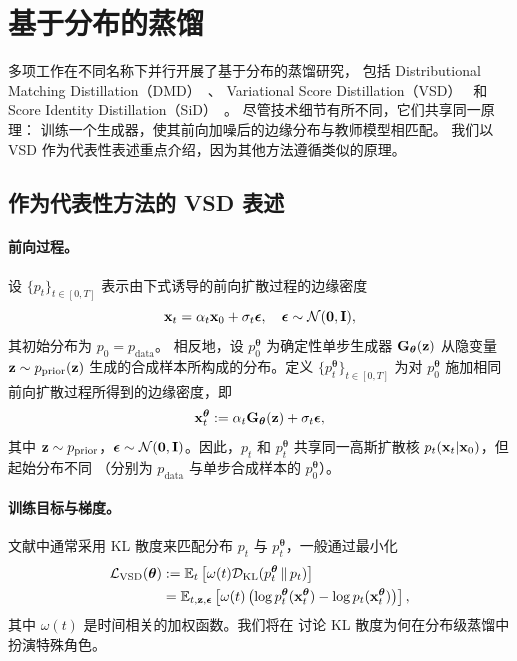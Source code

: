 \clearpage
\newpage



\section{\texorpdfstring{基于分布的蒸馏}{Distribution-Based Distillation}}\label{sec:VSD}


多项工作在不同名称下并行开展了基于分布的蒸馏研究，
包括 Distributional Matching Distillation（DMD）~\citep{yin2024one,yin2024improved}、
Variational Score Distillation（VSD）~\citep{pooledreamfusion,wang2023prolificdreamer,luo2023diff,lu2024simplifying}
和 Score Identity Distillation（SiD）~\citep{zhou2024score}。
尽管技术细节有所不同，它们共享同一原理：
训练一个生成器，使其前向加噪后的边缘分布与教师模型相匹配。
我们以 VSD 作为代表性表述重点介绍，因为其他方法遵循类似的原理。


\subsection{作为代表性方法的 VSD 表述}
\paragraph{前向过程。}
设 $\{p_t\}_{t \in [0,T]}$ 表示由下式诱导的前向扩散过程的边缘密度
\[
{\mathbf{x}}_t = \alpha_t {\mathbf{x}}_0 + \sigma_t \bm{\epsilon}, \quad \bm{\epsilon} \sim \mathcal{N}(\bm{0}, {\mathbf{I}}),
\]
其初始分布为 $p_0 = p_{\mathrm{data}}$。
相反地，设 $p_0^{\bm{\theta}}$ 为确定性单步生成器 ${\mathbf{G}}_{\bm{\theta}}({\mathbf{z}})$ 从隐变量 ${\mathbf{z}} \sim p_{\mathrm{prior}}({\mathbf{z}})$ 生成的合成样本所构成的分布。定义 $\{p_t^{\bm{\theta}}\}_{t \in [0,T]}$ 为对 $p_0^{\bm{\theta}}$ 施加相同前向扩散过程所得到的边缘密度，即
\begin{align}\label{eq:vsd-forward}
    {\mathbf{x}}_t^{\bm{\theta}} := \alpha_t {\mathbf{G}}_{\bm{\theta}}({\mathbf{z}}) + \sigma_t \bm{\epsilon}, 
\end{align}
其中 ${\mathbf{z}} \sim p_{\mathrm{prior}}$，$ \bm{\epsilon} \sim \mathcal{N}(\bm{0}, {\mathbf{I}})$。因此，$p_t$ 和 $p_t^{\bm{\theta}}$ 共享同一高斯扩散核
$p_t({\mathbf{x}}_t| {\mathbf{x}}_0)$，但起始分布不同
（分别为 $p_{\mathrm{data}}$ 与单步合成样本的 $p_0^{\bm{\theta}}$）。

\paragraph{训练目标与梯度。}
文献中通常采用 KL 散度来匹配分布 $p_t$ 与 $p_t^{\bm{\theta}}$，一般通过最小化
\begin{align*}
    \mathcal{L}_{\text{VSD}}(\bm{\theta}) &:=\mathbb{E}_t \left[ \omega(t)  \mathcal{D}_{\text{KL}}(p_t^{\bm{\theta}} \, \| \, p_t) \right]
\\&= \mathbb{E}_{t, {\mathbf{z}}, \bm{\epsilon}} \left[ \omega(t) \left( \log p_t^{\bm{\theta}}({\mathbf{x}}_t^{\bm{\theta}}) - \log p_t({\mathbf{x}}_t^{\bm{\theta}}) \right) \right],
\end{align*}
其中 $\omega(t)$ 是时间相关的加权函数。我们将在  讨论 KL 散度为何在分布级蒸馏中
扮演特殊角色。



